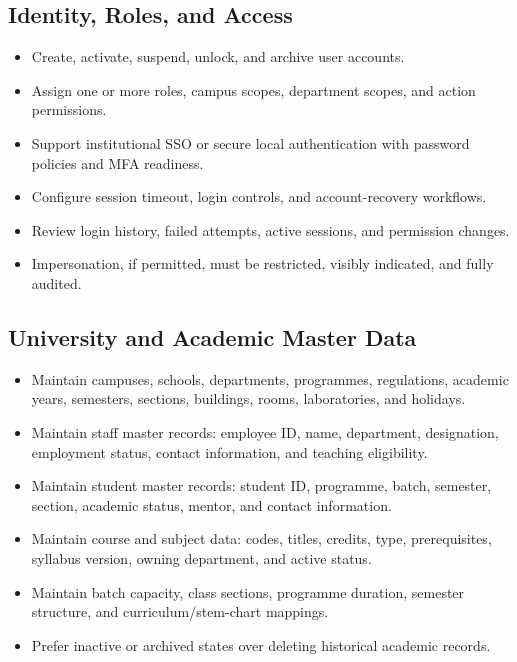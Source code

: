 \documentclass[10pt,a4paper]{article}
\begin{document}
\subsection{Identity, Roles, and Access}
\begin{itemize}
  \item Create, activate, suspend, unlock, and archive user accounts.
  \item Assign one or more roles, campus scopes, department scopes, and action permissions.
  \item Support institutional SSO or secure local authentication with password policies and MFA readiness.
  \item Configure session timeout, login controls, and account-recovery workflows.
  \item Review login history, failed attempts, active sessions, and permission changes.
  \item Impersonation, if permitted, must be restricted, visibly indicated, and fully audited.
\end{itemize}

\subsection{University and Academic Master Data}
\begin{itemize}
  \item Maintain campuses, schools, departments, programmes, regulations, academic years,
        semesters, sections, buildings, rooms, laboratories, and holidays.
  \item Maintain staff master records: employee ID, name, department, designation,
        employment status, contact information, and teaching eligibility.
  \item Maintain student master records: student ID, programme, batch, semester,
        section, academic status, mentor, and contact information.
  \item Maintain course and subject data: codes, titles, credits, type, prerequisites,
        syllabus version, owning department, and active status.
  \item Maintain batch capacity, class sections, programme duration, semester structure,
        and curriculum/stem-chart mappings.
  \item Prefer inactive or archived states over deleting historical academic records.
\end{itemize}
\end{document}
